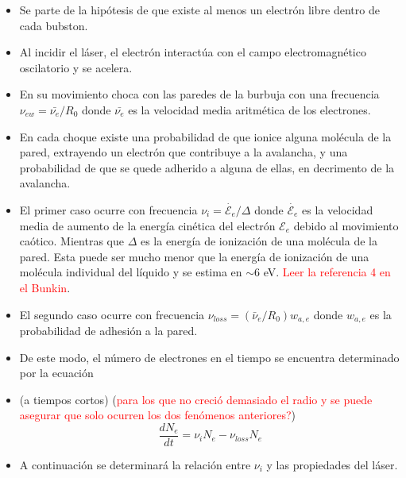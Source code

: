 \documentclass[aps,prb,twocolumn,superscriptaddress,floatfix,longbibliography,10pt]{revtex4-2}
\newcounter{para}
\begin{document}
\begin{itemize}
  \item Se parte de la hipótesis de que existe al menos un electrón libre dentro de cada bubston.
  \item Al incidir el láser, el electrón interactúa con el campo electromagnético oscilatorio y se acelera.
  \item En su movimiento choca con las paredes de la burbuja con una frecuencia $\nu_{e w} = \bar{\nu_e}/R_0$ donde $\bar{\nu_e}$ es la velocidad media aritmética de los electrones.
  \item En cada choque existe una probabilidad de que ionice alguna molécula de la pared, extrayendo un electrón que contribuye a la avalancha, y una probabilidad de que se quede adherido a alguna de ellas, en decrimento de la avalancha.
  \item El primer caso ocurre con frecuencia $\nu_i = \dot{\mathcal{E}_e}/\Delta$ donde $\dot{\mathcal{E}_e}$ es la velocidad media de aumento de la energía cinética del electrón ${\mathcal{E}_e}$ debido al movimiento caótico. Mientras que $\Delta$ es la energía de ionización de una molécula de la pared. Esta puede ser mucho menor que la energía de ionización de una molécula individual del líquido y se estima en $\sim 6$ eV. \textcolor{red}{Leer la referencia 4 en el Bunkin}. 
  \item El segundo caso ocurre con frecuencia $\nu_{loss} = (\bar{\nu}_e/R_0) w_{a,e}$ donde $w_{a,e}$ es la probabilidad de adhesión a la pared.
  \item De este modo, el número de electrones en el tiempo se encuentra determinado por la ecuación
  \item(a tiempos cortos) (\textcolor{red}{para los que no creció demasiado el radio y se puede asegurar que solo ocurren los dos fenómenos anteriores?})
  \begin{equation}
    \frac{dN_e}{dt} = \nu_i N_e - \nu_{loss} N_e
    \label{eq:dNedt_1}
  \end{equation}
  \item A continuación se determinará la relación entre $\nu_i$ y las propiedades del láser.
\end{itemize} 
\end{document}
